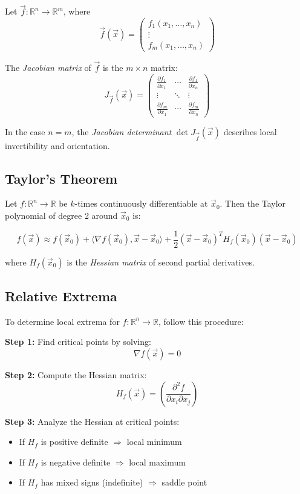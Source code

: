 Let \( \vec{f} : \mathbb{R}^n \to \mathbb{R}^m \), where
\[
\vec{f}(\vec{x}) = \begin{pmatrix}
f_1(x_1, \dots, x_n) \\
\vdots \\
f_m(x_1, \dots, x_n)
\end{pmatrix}
\]

The \emph{Jacobian matrix} of \( \vec{f} \) is the \( m \times n \) matrix:
\[
J_{\vec{f}}(\vec{x}) = \begin{pmatrix}
\frac{\partial f_1}{\partial x_1} & \cdots & \frac{\partial f_1}{\partial x_n} \\
\vdots & \ddots & \vdots \\
\frac{\partial f_m}{\partial x_1} & \cdots & \frac{\partial f_m}{\partial x_n}
\end{pmatrix}
\]

In the case \( n = m \), the \emph{Jacobian determinant} \( \det J_{\vec{f}}(\vec{x}) \) 
describes local invertibility and orientation.


\subsection{Taylor's Theorem}

Let \( f : \mathbb{R}^n \to \mathbb{R} \) be \( k \)-times continuously differentiable at \( \vec{x}_0 \). Then the Taylor polynomial of degree 2 around \( \vec{x}_0 \) is:

\[
f(\vec{x}) \approx f(\vec{x}_0) + \langle \nabla f(\vec{x}_0), \vec{x} - \vec{x}_0 \rangle + \frac{1}{2} {(\vec{x} - \vec{x}_0)}^T H_f(\vec{x}_0)(\vec{x} - \vec{x}_0)
\]

where \( H_f(\vec{x}_0) \) is the \emph{Hessian matrix} of second partial derivatives.


\subsection{Relative Extrema}

To determine local extrema for \( f : \mathbb{R}^n \to \mathbb{R} \), follow this procedure:

\textbf{Step 1:} Find critical points by solving:
\[
\nabla f(\vec{x}) = 0
\]

\textbf{Step 2:} Compute the Hessian matrix:
\[
H_f(\vec{x}) = \left( \frac{\partial^2 f}{\partial x_i \partial x_j} \right)
\]

\textbf{Step 3:} Analyze the Hessian at critical points:
\begin{itemize}[label=\(-\)]
\item If \( H_f \) is positive definite \( \Rightarrow \) local minimum
\item If \( H_f \) is negative definite \( \Rightarrow \) local maximum
\item If \( H_f \) has mixed signs (indefinite) \( \Rightarrow \) saddle point
\end{itemize}

